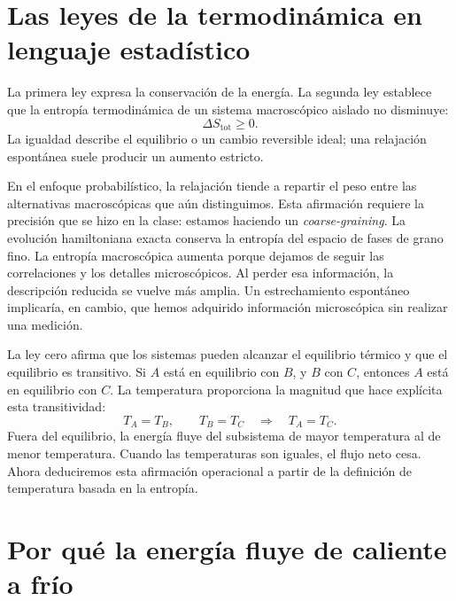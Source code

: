 \section{Las leyes de la termodinámica en lenguaje estadístico}

La primera ley expresa la conservación de la energía. La segunda ley establece que la entropía termodinámica de un sistema macroscópico aislado no disminuye:
\begin{equation}
 \Delta S_{\mathrm{tot}}\geq0.
 \label{eq:sm3-second-law}
\end{equation}
La igualdad describe el equilibrio o un cambio reversible ideal; una relajación espontánea suele producir un aumento estricto.

En el enfoque probabilístico, la relajación tiende a repartir el peso entre las alternativas macroscópicas que aún distinguimos. Esta afirmación requiere la precisión que se hizo en la clase: estamos haciendo un \emph{coarse-graining}. La evolución hamiltoniana exacta conserva la entropía del espacio de fases de grano fino. La entropía macroscópica aumenta porque dejamos de seguir las correlaciones y los detalles microscópicos. Al perder esa información, la descripción reducida se vuelve más amplia. Un estrechamiento espontáneo implicaría, en cambio, que hemos adquirido información microscópica sin realizar una medición.

La ley cero afirma que los sistemas pueden alcanzar el equilibrio térmico y que el equilibrio es transitivo. Si \(A\) está en equilibrio con \(B\), y \(B\) con \(C\), entonces \(A\) está en equilibrio con \(C\). La temperatura proporciona la magnitud que hace explícita esta transitividad:
\[
 T_A=T_B,\qquad T_B=T_C
 \quad\Longrightarrow\quad
 T_A=T_C.
\]
Fuera del equilibrio, la energía fluye del subsistema de mayor temperatura al de menor temperatura. Cuando las temperaturas son iguales, el flujo neto cesa. Ahora deduciremos esta afirmación operacional a partir de la definición de temperatura basada en la entropía.

\section{Por qué la energía fluye de caliente a frío}

